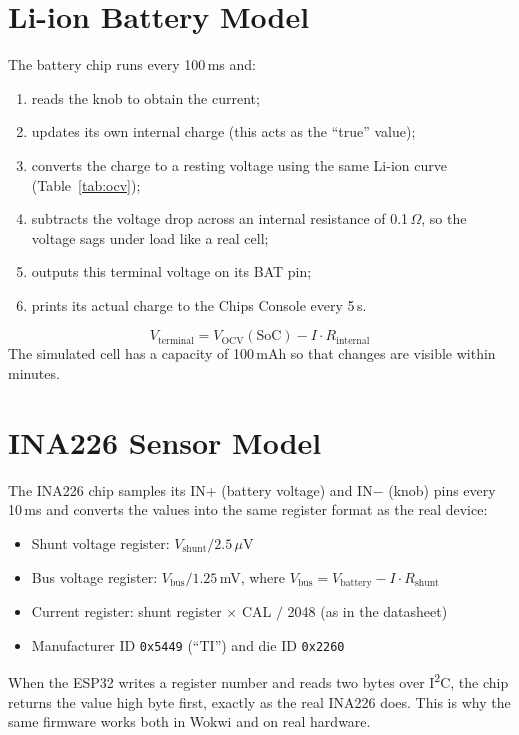 \documentclass[12pt,a4paper,oneside]{report}
\begin{document}
\section{Li-ion Battery Model}
The battery chip runs every 100\,ms and:
\begin{enumerate}
  \item reads the knob to obtain the current;
  \item updates its own internal charge (this acts as the ``true'' value);
  \item converts the charge to a resting voltage using the same Li-ion curve (Table~\ref{tab:ocv});
  \item subtracts the voltage drop across an internal resistance of 0.1\,$\Omega$, so the voltage sags under load like a real cell;
  \item outputs this terminal voltage on its BAT pin;
  \item prints its actual charge to the Chips Console every 5\,s.
\end{enumerate}
\begin{equation}
  V_{\text{terminal}} = V_{\text{OCV}}(\text{SoC}) - I \cdot R_{\text{internal}}
\end{equation}
The simulated cell has a capacity of 100\,mAh so that changes are visible within minutes.

\section{INA226 Sensor Model}
The INA226 chip samples its IN+ (battery voltage) and IN$-$ (knob) pins every 10\,ms and converts the values into the same register format as the real device:
\begin{itemize}
  \item Shunt voltage register: $V_{\text{shunt}} / 2.5\,\mu$V
  \item Bus voltage register: $V_{\text{bus}} / 1.25$\,mV, where $V_{\text{bus}} = V_{\text{battery}} - I \cdot R_{\text{shunt}}$
  \item Current register: shunt register $\times$ CAL $/$ 2048 (as in the datasheet)
  \item Manufacturer ID \texttt{0x5449} (``TI'') and die ID \texttt{0x2260}
\end{itemize}
When the ESP32 writes a register number and reads two bytes over I\textsuperscript{2}C, the chip returns the value high byte first, exactly as the real INA226 does. This is why the same firmware works both in Wokwi and on real hardware.
\end{document}
